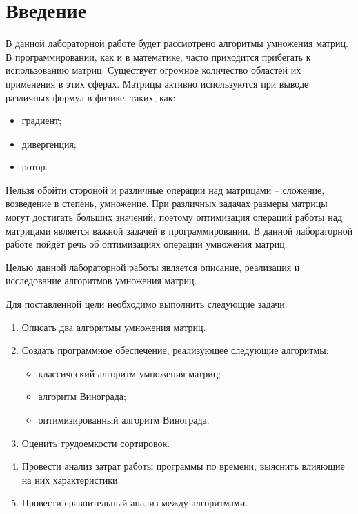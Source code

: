 \chapter*{Введение}

В данной лабораторной работе будет рассмотрено алгоритмы умножения матриц. В программировании, как и в математике, часто приходится прибегать к использованию матриц. Существует огромное количество областей их применения в этих сферах. Матрицы активно используются при выводе различных формул в физике, таких, как:
\begin{itemize}
	\item градиент;
	\item дивергенция;
	\item ротор.
\end{itemize}

Нельзя обойти стороной и различные операции над матрицами – сложение, возведение в степень, умножение. При различных задачах размеры матрицы могут достигать больших значений, поэтому оптимизация операций работы над матрицами является важной задачей в программировании. В данной лабораторной работе пойдёт речь об оптимизациях операции умножения матриц.

Целью данной лабораторной работы является описание, реализация и исследование алгоритмов умножения матриц.

Для поставленной цели необходимо выполнить следующие задачи.
\begin{enumerate}[label={\arabic*)}]
	\item Описать два алгоритмы умножения матриц.
	\item Создать программное обеспечение, реализующее следующие алгоритмы:
	\begin{itemize}[label=---]
		\item классический алгоритм умножения матриц;
		\item алгоритм Винограда;
		\item оптимизированный алгоритм Винограда.
	\end{itemize}
	\item Оценить трудоемкости сортировок.
	\item Провести анализ затрат работы программы по времени, выяснить влияющие на них характеристики.
	\item Провести сравнительный анализ между алгоритмами.
\end{enumerate}